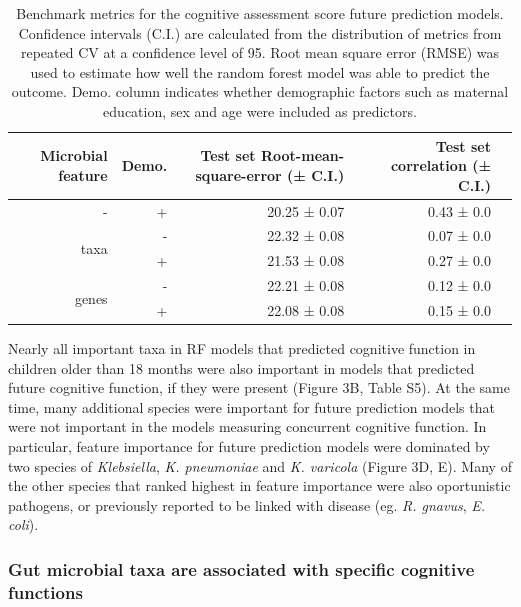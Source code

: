 \documentclass{article}
\begin{document}
\begin{table}[!h]
    \begin{center}
    \begin{tabular}{|r|r|r|r|r}
        \hline
        \textbf{Microbial feature} & \textbf{Demo.} &  \textbf{Test set Root-mean-square-error (± C.I.)} & \textbf{Test set correlation (± C.I.)} \\\hline
        - & + & 20.25 ± 0.07 & 0.43 ± 0.0 \\ \cline{1-4}
        \multirow{2}{*}{taxa} & - & 22.32 ± 0.08 & 0.07 ± 0.0 \\ \cline{2-4}
            & + & 21.53 ± 0.08 & 0.27 ± 0.0 \\ \cline{1-4}
        \multirow{2}{*}{genes} & - & 22.21 ± 0.08 & 0.12 ± 0.0 \\ \cline{2-4}
            & + & 22.08 ± 0.08 & 0.15 ± 0.0 \\\hline\hline
    \end{tabular}
    \caption{\label{tab:rfbench2}Benchmark metrics for the cognitive assessment score
    future prediction models. Confidence intervals (C.I.) are calculated from the
    distribution of metrics from repeated CV at a confidence level of 95.
    Root mean square error (RMSE) was used to estimate how well the random forest model was able to predict the outcome.
    Demo. column indicates whether demographic factors such as maternal education, sex and age were included as predictors.}
    \end{center}
\end{table}

Nearly all important taxa in RF models that predicted cognitive function
in children older than 18 months were also important in
models that predicted future cognitive function, if they were present (Figure 3B, Table S5).
At the same time, many additional species were important for future prediction models
that were not important in the models measuring concurrent cognitive function.
In particular, feature importance for future prediction models
were dominated by two species of \textit{Klebsiella},
\textit{K. pneumoniae} and \textit{K. varicola} (Figure 3D, E).
Many of the other species that ranked highest in feature importance
were also oportunistic pathogens, or previously reported
to be linked with disease (eg. \textit{R. gnavus}, \textit{E. coli}).

\subsubsection*{Gut microbial taxa are associated with specific cognitive functions}
\end{document}
